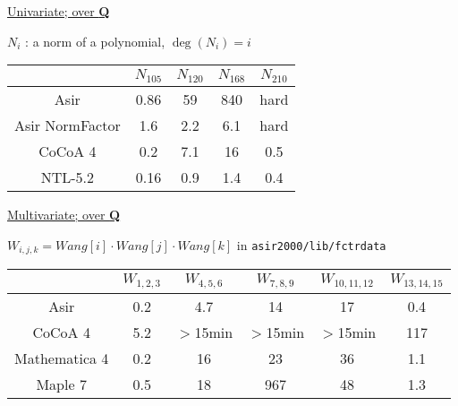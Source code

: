 \begin{slide}{}

\underline{Univariate; over {\bf Q}}

$N_i$ : a norm of a polynomial, $\deg(N_i) = i$
\begin{center}
\begin{tabular}{|c||c|c|c|c|} \hline
		& $N_{105}$ & $N_{120}$ & $N_{168}$ & $N_{210}$ \\ \hline
Asir 	& 0.86	& 59 & 840 & hard \\ \hline
Asir NormFactor & 1.6 	& 2.2& 6.1& hard \\ \hline
CoCoA 4 & 0.2 	& 7.1	& 16 & 0.5 \\ \hline\hline
NTL-5.2	& 0.16 	& 0.9 	& 1.4 & 0.4 \\ \hline
\end{tabular}
\end{center}

\underline{Multivariate; over {\bf Q}}

$W_{i,j,k} = Wang[i]\cdot Wang[j]\cdot Wang[k]$ in {\tt asir2000/lib/fctrdata}
\begin{center}
\begin{tabular}{|c||c|c|c|c|c|} \hline
	& $W_{1,2,3}$ & $W_{4,5,6}$ & $W_{7,8,9}$ & $W_{10,11,12}$ & $W_{13,14,15}$ \\ \hline
Asir 	& 0.2 & 4.7 & 14 & 17 & 0.4 \\ \hline
CoCoA 4 & 5.2 & $>$15min 	& $>$15min & $>$15min & 117 \\ \hline\hline
Mathematica 4& 0.2 	& 16 	& 23 & 36 & 1.1 \\ \hline
Maple 7& 0.5 	& 18 	& 967  & 48 & 1.3 \\ \hline
\end{tabular}
\end{center}

\end{slide}

